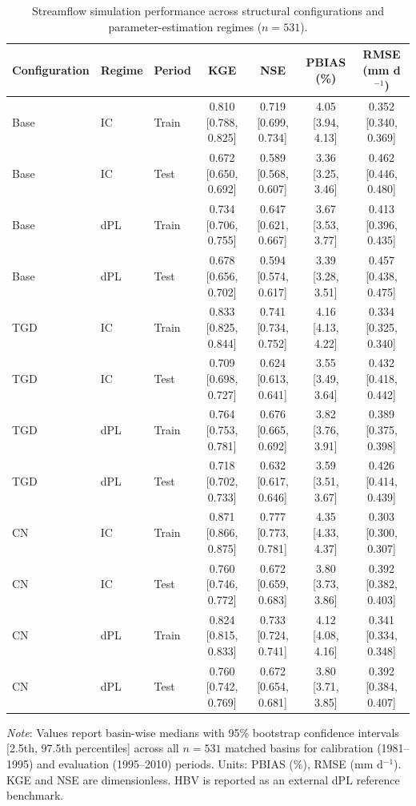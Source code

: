 \begin{table}[t]
\centering
\caption{Streamflow simulation performance across structural configurations and parameter-estimation regimes ($n = 531$).}
\label{tab:table1_absolute_performance}
\begin{threeparttable}
\begin{tabular}{lllcccc}
\toprule
Configuration & Regime & Period & KGE & NSE & PBIAS (\%) & RMSE (mm d$^{-1}$) \\
\midrule
Base & IC & Train & 0.810 [0.788, 0.825] & 0.719 [0.699, 0.734] & 4.05 [3.94, 4.13] & 0.352 [0.340, 0.369] \\
Base & IC & Test & 0.672 [0.650, 0.692] & 0.589 [0.568, 0.607] & 3.36 [3.25, 3.46] & 0.462 [0.446, 0.480] \\
Base & dPL & Train & 0.734 [0.706, 0.755] & 0.647 [0.621, 0.667] & 3.67 [3.53, 3.77] & 0.413 [0.396, 0.435] \\
Base & dPL & Test & 0.678 [0.656, 0.702] & 0.594 [0.574, 0.617] & 3.39 [3.28, 3.51] & 0.457 [0.438, 0.475] \\
TGD & IC & Train & 0.833 [0.825, 0.844] & 0.741 [0.734, 0.752] & 4.16 [4.13, 4.22] & 0.334 [0.325, 0.340] \\
TGD & IC & Test & 0.709 [0.698, 0.727] & 0.624 [0.613, 0.641] & 3.55 [3.49, 3.64] & 0.432 [0.418, 0.442] \\
TGD & dPL & Train & 0.764 [0.753, 0.781] & 0.676 [0.665, 0.692] & 3.82 [3.76, 3.91] & 0.389 [0.375, 0.398] \\
TGD & dPL & Test & 0.718 [0.702, 0.733] & 0.632 [0.617, 0.646] & 3.59 [3.51, 3.67] & 0.426 [0.414, 0.439] \\
CN & IC & Train & 0.871 [0.866, 0.875] & 0.777 [0.773, 0.781] & 4.35 [4.33, 4.37] & 0.303 [0.300, 0.307] \\
CN & IC & Test & 0.760 [0.746, 0.772] & 0.672 [0.659, 0.683] & 3.80 [3.73, 3.86] & 0.392 [0.382, 0.403] \\
CN & dPL & Train & 0.824 [0.815, 0.833] & 0.733 [0.724, 0.741] & 4.12 [4.08, 4.16] & 0.341 [0.334, 0.348] \\
CN & dPL & Test & 0.760 [0.742, 0.769] & 0.672 [0.654, 0.681] & 3.80 [3.71, 3.85] & 0.392 [0.384, 0.407] \\
\bottomrule
\end{tabular}
\begin{tablenotes}[flushleft]
\small
\item \textit{Note}: Values report basin-wise medians with 95\% bootstrap confidence intervals [2.5th, 97.5th percentiles] across all $n = 531$ matched basins for calibration (1981--1995) and evaluation (1995--2010) periods. Units: PBIAS (\%), RMSE (mm d$^{-1}$). KGE and NSE are dimensionless. HBV is reported as an external dPL reference benchmark.
\end{tablenotes}
\end{threeparttable}
\end{table}
